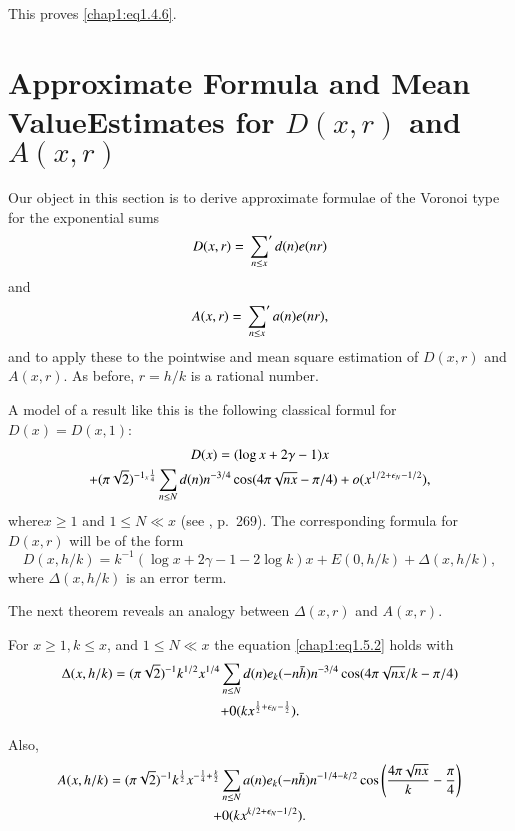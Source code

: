This proves \eqref{chap1:eq1.4.6}.

\section[Approximate Formulae and...]{Approximate Formula and Mean
  Value\hfil\break Estimates for $D(x,r)$ and $A(x,r)$}\label{chap1:sec1.5}  

Our object in this section is to derive approximate formulae of the
Voro\-noi type for the exponential sums
$$
D(x,r)=\sideset{}{'}\sum\limits_{n\leq x}d(n)e(nr)
$$
and
$$
A(x,r)=\sideset{}{'}\sum\limits_{n\leq x}a(n)e(nr),
$$
and to apply these to the pointwise and mean square estimation of
$D(x,r)$ and $A(x,r)$. As before, $r=h/k$ is a rational number.

A model of a result like this is the following classical formul for
$D(x)=D(x,1)$: 
\begin{gather}
D(x)=(\log x+2\gamma-1)x\label{chap1:eq1.5.1}\\
+(\pi\sqrt{2})^{-1_x{\frac{1}{4}}}\sum\limits_{n\leq N}d(n)n^{-3/4}\cos
(4\pi\sqrt{nx}-\pi/4)+o(x^{1/2+\epsilon_N-1/2}),\notag
\end{gather}
where\pageoriginale $x\geq 1$ and $1\leq N\ll x$ (see \cite{key27},
p.~269). The corresponding formula for $D(x,r)$ will be of the form 
\begin{equation}\label{chap1:eq1.5.2}
D(x,h/k)=k^{-1}(\log x+2\gamma-1-2 \log k)x+E(0,h/k)+\Delta (x,h/k),
\end{equation}
where $\Delta(x,h/k)$ is an error term.

The next theorem reveals an analogy between $\Delta(x,r)$ and
$A(x,r)$. 
\begin{THM}\label{chap1:thm1.1}
For $x\geq 1, k\leq x$, and $1\leq N\ll x$ the equation
\eqref{chap1:eq1.5.2} holds with 
\begin{gather}
\Delta (x,h/k)=(\pi\sqrt{2})^{-1} k^{1/2} x^{1/4}\sum\limits_{n\leq N} d(n)
e_k(-n\bar{h})n^{-3/4}\cos(4\pi\sqrt{nx}/k-
\pi/4)\label{chap1:eq1.5.3}\\ 
+0(k x^{\frac{1}{2} +\epsilon_N-\frac{1}{2}}).\notag
\end{gather}

Also,
{\fontsize{10}{12}\selectfont
\begin{gather}
A(x,h/k)=(\pi\sqrt{2})^{-1}k^{\frac{1}{2}} x^{-\frac{1}{4}+
    \frac{k}{2}}\sum\limits_{n\leq N} 
a(n)e_k(-n\bar{h})n^{-1/4-k/2}\cos \left(\frac{4\pi\sqrt{nx}}{k}
-\frac{\pi}{4}\right)\label{chap1:eq1.5.4}\\
+0(kx^{k/2+\epsilon_N-1/2}).\notag
\end{gather}}
\end{THM}

